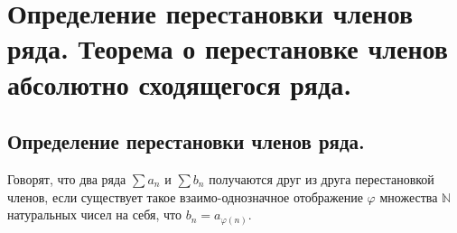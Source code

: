 \section{Определение перестановки членов ряда. Теорема о перестановке членов абсолютно сходящегося ряда.}

\subsection{Определение перестановки членов ряда.}
\begin{definition}
    Говорят, что два ряда $\sum a_n$ и $\sum b_n$ получаются друг из друга перестановкой членов, если существует такое взаимо-однозначное отображение $\varphi$ множества $\mathbb{N}$ натуральных чисел на себя, что $b_n = a_{\varphi(n)}$.
\end{definition}

